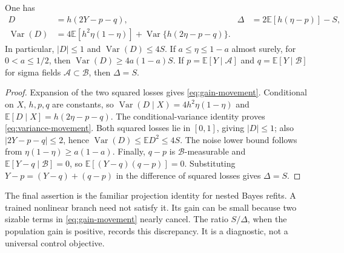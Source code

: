 \begin{proposition}
\label{prop:movement}
One has
\begin{align}
 D&=h(2Y-p-q), & \Delta&=2\mathbb E[h(\eta-p)]-S,\label{eq:gain-movement}\\
 \operatorname{Var}(D)
 &=4\mathbb E[h^2\eta(1-\eta)]
   +\operatorname{Var}\{h(2\eta-p-q)\}.\label{eq:variance-movement}
\end{align}
In particular, $|D|\le1$ and $\operatorname{Var}(D)\le4S$.
If $a\le\eta\le1-a$ almost surely, for $0<a\le1/2$, then
$\operatorname{Var}(D)\ge4a(1-a)S$.
If $p=\mathbb E[Y\mid\mathcal A]$ and
$q=\mathbb E[Y\mid\mathcal B]$ for sigma fields
$\mathcal A\subset\mathcal B$, then $\Delta=S$.
\end{proposition}
\begin{proof}
Expansion of the two squared losses gives \eqref{eq:gain-movement}.
Conditional on $X$, $h,p,q$ are constants, so
$\operatorname{Var}(D\mid X)=4h^2\eta(1-\eta)$ and
$\mathbb E[D\mid X]=h(2\eta-p-q)$.
The conditional-variance identity proves \eqref{eq:variance-movement}.
Both squared losses lie in $[0,1]$, giving $|D|\le1$; also
$|2Y-p-q|\le2$, hence $\operatorname{Var}(D)\le\mathbb ED^2\le4S$.
The noise lower bound follows from $\eta(1-\eta)\ge a(1-a)$.
Finally, $q-p$ is $\mathcal B$-measurable and
$\mathbb E[Y-q\mid\mathcal B]=0$, so
$\mathbb E[(Y-q)(q-p)]=0$. Substituting
$Y-p=(Y-q)+(q-p)$ in the difference of squared losses gives $\Delta=S$.
\end{proof}

The final assertion is the familiar projection identity for nested Bayes
refits. A trained nonlinear branch need not satisfy it. Its gain can be
small because two sizable terms in \eqref{eq:gain-movement} nearly cancel.
The ratio $S/\Delta$, when the population gain is positive, records this
discrepancy. It is a diagnostic, not a universal control objective.

